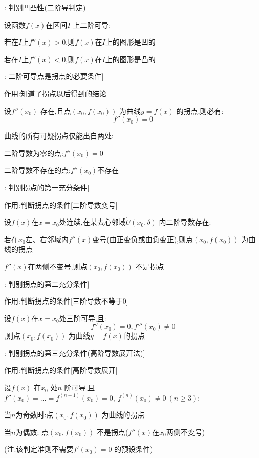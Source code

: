 \documentclass[11pt,a4paper,UTF8]{ctexart}
\begin{document}
\begin{thmbox}[原理[1]: 判别凹凸性(二阶导判定)]

设函数$f(x)$在区间$I$ 上二阶可导:

若在$I$上$f''(x) > 0$,则$f(x)$在$I$上的图形是凹的

若在$I$上$f''(x) < 0$,则$f(x)$在$I$上的图形是凸的

\end{thmbox}
\begin{thmbox}[原理[2]: 二阶可导点是拐点的必要条件]

作用:知道了拐点以后得到的结论

设$f''(x_0)$ 存在,且点$(x_0, f(x_0))$ 为曲线$y = f(x)$ 的拐点,则必有:
\begin{equation*}
f''(x_0) = 0
\end{equation*}


曲线的所有可疑拐点仅能出自两处:

  二阶导数为零的点:$f''(x_0) = 0$

  二阶导数不存在的点:$f''(x_0)$不存在

\end{thmbox}
\begin{thmbox}[原理[3]: 判别拐点的第一充分条件]

作用:判断拐点的条件[二阶导数变号]

设$f(x)$在$x = x_0$处连续,在某去心邻域$\mathring{U}(x_0, \delta)$ 内二阶导数存在:

若在$x_0$左、右邻域内$f''(x)$变号(由正变负或由负变正),则点$(x_0, f(x_0))$ 为曲线的拐点

	$f''(x)$在两侧不变号,则点$(x_0, f(x_0))$ 不是拐点

\end{thmbox}
\begin{thmbox}[原理[4]: 判别拐点的第二充分条件]

作用:判断拐点的条件[三阶导数不等于0]

设$f(x)$在$x = x_0$处三阶可导,且:
\begin{equation*}
f''(x_0) = 0, f'''(x_0) \neq 0
\end{equation*}
,则点$(x_0, f(x_0))$ 为曲线$y = f(x)$的拐点

\end{thmbox}
\begin{thmbox}[原理[5]: 判别拐点的第三充分条件(高阶导数展开法)]

作用:判断拐点的条件[高阶导数展开]

设$f(x)$ 在$x_0$ 处$n$ 阶可导,且$f''(x_0) = \dots = f^{(n-1)}(x_0) = 0, \ f^{(n)}(x_0) \neq 0 \ (n \ge 3)$:

  当$n$为奇数时:点$(x_0, f(x_0))$ 为曲线的拐点

  当$n$为偶数: 点$(x_0, f(x_0))$ 不是拐点($f''(x)$在$x_0$两侧不变号)

  (注:该判定准则不需要$f'(x_0) = 0$ 的预设条件)

\end{thmbox}
\end{document}
